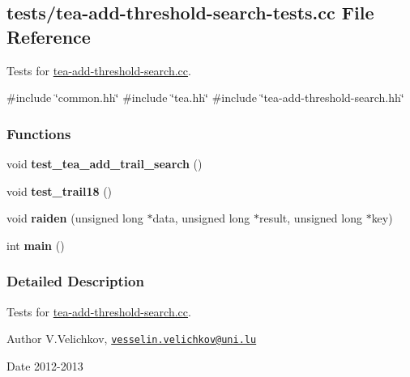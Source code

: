 \hypertarget{tea-add-threshold-search-tests_8cc}{\subsection{tests/tea-\/add-\/threshold-\/search-\/tests.cc \-File \-Reference}
\label{tea-add-threshold-search-tests_8cc}
}


\-Tests for \hyperlink{tea-add-threshold-search_8cc}{tea-\/add-\/threshold-\/search.\-cc}.  


{\ttfamily \#include \char`\"{}common.\-hh\char`\"{}}\*
{\ttfamily \#include \char`\"{}tea.\-hh\char`\"{}}\*
{\ttfamily \#include \char`\"{}tea-\/add-\/threshold-\/search.\-hh\char`\"{}}\*
\subsubsection*{\-Functions}
\begin{DoxyCompactItemize}
\item 
\hypertarget{tea-add-threshold-search-tests_8cc_a8964a48e76a1a0688f8f77593cb2de90}{void {\bfseries test\-\_\-tea\-\_\-add\-\_\-trail\-\_\-search} ()}\label{tea-add-threshold-search-tests_8cc_a8964a48e76a1a0688f8f77593cb2de90}

\item 
\hypertarget{tea-add-threshold-search-tests_8cc_a140721668d29ab1503092f3863901623}{void {\bfseries test\-\_\-trail18} ()}\label{tea-add-threshold-search-tests_8cc_a140721668d29ab1503092f3863901623}

\item 
\hypertarget{tea-add-threshold-search-tests_8cc_af5069e6fc99476da04e87f27bf8597ac}{void {\bfseries raiden} (unsigned long $\ast$data, unsigned long $\ast$result, unsigned long $\ast$key)}\label{tea-add-threshold-search-tests_8cc_af5069e6fc99476da04e87f27bf8597ac}

\item 
\hypertarget{tea-add-threshold-search-tests_8cc_ae66f6b31b5ad750f1fe042a706a4e3d4}{int {\bfseries main} ()}\label{tea-add-threshold-search-tests_8cc_ae66f6b31b5ad750f1fe042a706a4e3d4}

\end{DoxyCompactItemize}


\subsubsection{\-Detailed \-Description}
\-Tests for \hyperlink{tea-add-threshold-search_8cc}{tea-\/add-\/threshold-\/search.\-cc}. \begin{DoxyAuthor}{\-Author}
\-V.\-Velichkov, \href{mailto:vesselin.velichkov@uni.lu}{\tt vesselin.\-velichkov@uni.\-lu} 
\end{DoxyAuthor}
\begin{DoxyDate}{\-Date}
2012-\/2013 
\end{DoxyDate}

